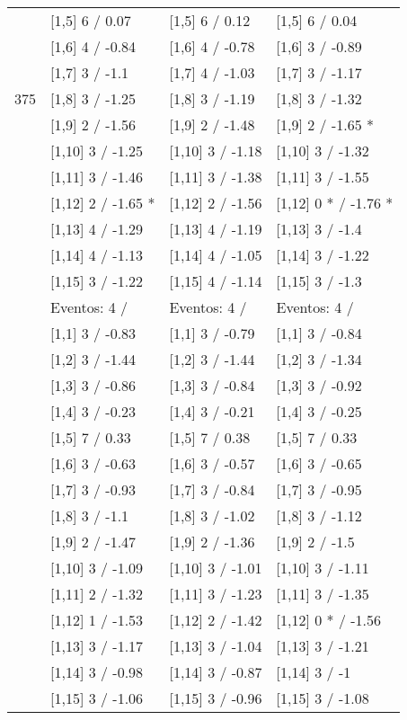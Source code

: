 \begin{table}
\begin{tabular}[t]{llll}
 & {}[1,5] 6  / 0.07 & {}[1,5] 6  / 0.12 & {}[1,5] 6  / 0.04\\
 & {}[1,6] 4  / -0.84 & {}[1,6] 4  / -0.78 & {}[1,6] 3  / -0.89\\
 & {}[1,7] 3  / -1.1 & {}[1,7] 4  / -1.03 & {}[1,7] 3  / -1.17\\
375 & {}[1,8] 3  / -1.25 & {}[1,8] 3  / -1.19 & {}[1,8] 3  / -1.32\\
\addlinespace
 & {}[1,9] 2  / -1.56 & {}[1,9] 2  / -1.48 & {}[1,9] 2  / -1.65 *\\
 & {}[1,10] 3  / -1.25 & {}[1,10] 3  / -1.18 & {}[1,10] 3  / -1.32\\
 & {}[1,11] 3  / -1.46 & {}[1,11] 3  / -1.38 & {}[1,11] 3  / -1.55\\
 & {}[1,12] 2  / -1.65 * & {}[1,12] 2  / -1.56 & {}[1,12] 0 * / -1.76 *\\
 & {}[1,13] 4  / -1.29 & {}[1,13] 4  / -1.19 & {}[1,13] 3  / -1.4\\
\addlinespace
 & {}[1,14] 4  / -1.13 & {}[1,14] 4  / -1.05 & {}[1,14] 3  / -1.22\\
 & {}[1,15] 3  / -1.22 & {}[1,15] 4  / -1.14 & {}[1,15] 3  / -1.3\\
 & Eventos:  4 / & Eventos:  4 / & Eventos:  4 /\\
 & {}[1,1] 3  / -0.83 & {}[1,1] 3  / -0.79 & {}[1,1] 3  / -0.84\\
 & {}[1,2] 3  / -1.44 & {}[1,2] 3  / -1.44 & {}[1,2] 3  / -1.34\\
\addlinespace
 & {}[1,3] 3  / -0.86 & {}[1,3] 3  / -0.84 & {}[1,3] 3  / -0.92\\
 & {}[1,4] 3  / -0.23 & {}[1,4] 3  / -0.21 & {}[1,4] 3  / -0.25\\
 & {}[1,5] 7  / 0.33 & {}[1,5] 7  / 0.38 & {}[1,5] 7  / 0.33\\
 & {}[1,6] 3  / -0.63 & {}[1,6] 3  / -0.57 & {}[1,6] 3  / -0.65\\
 & {}[1,7] 3  / -0.93 & {}[1,7] 3  / -0.84 & {}[1,7] 3  / -0.95\\
\addlinespace
500 & {}[1,8] 3  / -1.1 & {}[1,8] 3  / -1.02 & {}[1,8] 3  / -1.12\\
 & {}[1,9] 2  / -1.47 & {}[1,9] 2  / -1.36 & {}[1,9] 2  / -1.5\\
 & {}[1,10] 3  / -1.09 & {}[1,10] 3  / -1.01 & {}[1,10] 3  / -1.11\\
 & {}[1,11] 2  / -1.32 & {}[1,11] 3  / -1.23 & {}[1,11] 3  / -1.35\\
 & {}[1,12] 1  / -1.53 & {}[1,12] 2  / -1.42 & {}[1,12] 0 * / -1.56\\
\addlinespace
 & {}[1,13] 3  / -1.17 & {}[1,13] 3  / -1.04 & {}[1,13] 3  / -1.21\\
 & {}[1,14] 3  / -0.98 & {}[1,14] 3  / -0.87 & {}[1,14] 3  / -1\\
 & {}[1,15] 3  / -1.06 & {}[1,15] 3  / -0.96 & {}[1,15] 3  / -1.08\\
\bottomrule
\end{tabular}
\end{table}
